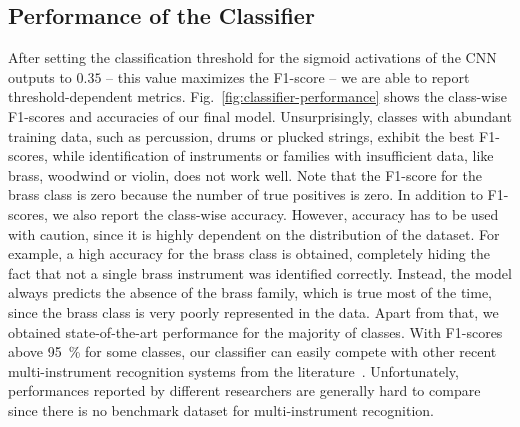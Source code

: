 \documentclass{article}
\begin{document}
\subsection{Performance of the Classifier}
\label{sec:experiments:performance}
After setting the classification threshold for the sigmoid activations of the CNN outputs to $0.35$ -- this value maximizes the F1-score -- we are able to report threshold-dependent metrics. Fig.~\ref{fig:classifier-performance} shows the class-wise F1-scores and accuracies of our final model. Unsurprisingly, classes with abundant training data, such as percussion, drums or plucked strings, exhibit the best F1-scores, while identification of instruments or families with insufficient data, like brass, woodwind or violin, does not work well. Note that the F1-score for the brass class is zero because the number of true positives is zero. In addition to F1-scores, we also report the class-wise accuracy. However, accuracy has to be used with caution, since it is highly dependent on the distribution of the dataset. For example, a high accuracy for the brass class is obtained, completely hiding the fact that not a single brass instrument was identified correctly. Instead, the model always predicts the absence of the brass family, which is true most of the time, since the brass class is very poorly represented in the data. Apart from that, we obtained state-of-the-art performance for the majority of classes. With F1-scores above \SI{95}{\percent} for some classes, our classifier can easily compete with other recent multi-instrument recognition systems from the literature~\cite{gururani2019attention, seipel2018music, kadandale2018musical}. Unfortunately, performances reported by different researchers are generally hard to compare since there is no benchmark dataset for multi-instrument recognition.
\end{document}

